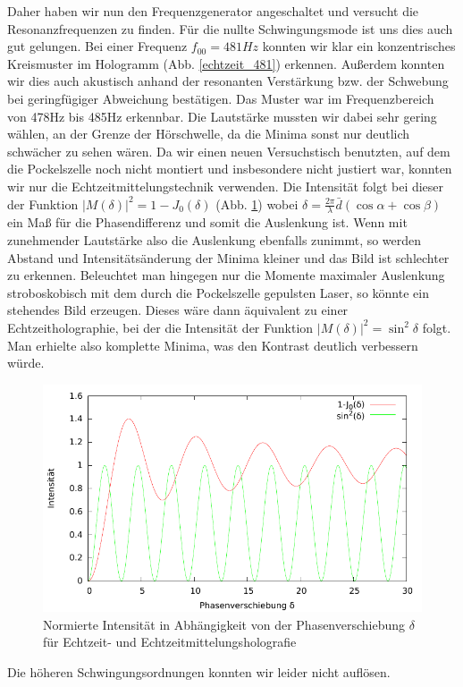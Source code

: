 Daher haben wir nun den Frequenzgenerator angeschaltet und versucht die Resonanzfrequenzen zu finden. Für die nullte Schwingungsmode ist uns dies auch gut gelungen. Bei einer Frequenz $f_{00} = 481 Hz$ konnten wir klar ein konzentrisches Kreismuster im Hologramm (Abb. \ref{echtzeit_481}) erkennen. Außerdem konnten wir dies auch akustisch anhand der resonanten Verstärkung bzw. der Schwebung bei geringfügiger Abweichung bestätigen. Das Muster war im Frequenzbereich von 478Hz bis 485Hz erkennbar. Die Lautstärke mussten wir dabei sehr gering wählen, an der Grenze der Hörschwelle, da die Minima sonst nur deutlich schwächer zu sehen wären. Da wir einen neuen Versuchstisch benutzten, auf dem die Pockelszelle noch nicht montiert und insbesondere nicht justiert war, konnten wir nur die Echtzeitmittelungstechnik verwenden. Die Intensität folgt bei dieser der Funktion $|M(\delta)|^2 = 1 - J_0(\delta)$ (Abb. \ref{echtzeit_intensität}) wobei $\delta = \frac{2\pi}{\lambda}\bar{d}(\cos \alpha + \cos \beta)$ ein Maß für die Phasendifferenz und somit die Auslenkung ist. Wenn mit zunehmender Lautstärke also die Auslenkung ebenfalls zunimmt, so werden Abstand und Intensitätsänderung der Minima kleiner und das Bild ist schlechter zu erkennen. Beleuchtet man hingegen nur die Momente maximaler Auslenkung stroboskobisch mit dem durch die Pockelszelle gepulsten Laser, so könnte ein stehendes Bild erzeugen. Dieses wäre dann äquivalent zu einer Echtzeitholographie, bei der die Intensität der Funktion $|M(\delta)|^2 = \sin^2 \delta$ folgt. Man erhielte also komplette Minima, was den Kontrast deutlich verbessern würde.

\begin{figure}[H]
\includegraphics[width=\textwidth]{Graphen/echtzeitmittelung.pdf}
\caption{Normierte Intensität in Abhängigkeit von der Phasenverschiebung $\delta$ für Echtzeit- und Echtzeitmittelungsholografie}
\label{echtzeit_intensität}
\end{figure}

Die höheren Schwingungsordnungen konnten wir leider nicht auflösen. %